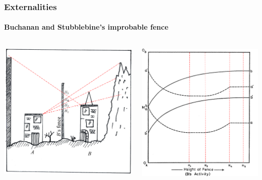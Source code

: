 \documentclass[handout, notes=hide]{beamer}
\begin{document}
\begin{frame}
\frametitle{Externalities}
\framesubtitle{Buchanan and Stubblebine's improbable fence}
\begin{columns}[T]
\begin{column}[T]{0.5\textwidth}
\includegraphics[width=\textwidth]{fence-lines}
\end{column}
\begin{column}[T]{0.5\textwidth}
\includegraphics[width=\textwidth]{fence-graphlines}
\end{column}
\end{columns}

\end{frame}
\end{document}
